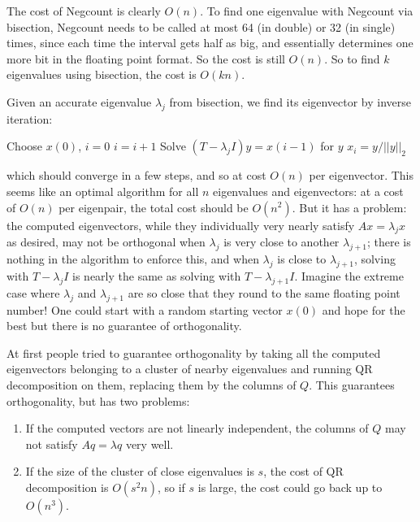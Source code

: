 \documentclass[11pt]{article}
\numberwithin{equation}{section}
\begin{document}
The cost of Negcount is clearly $O(n)$. To find one eigenvalue with Negcount via bisection, Negcount needs to be called at most 64 (in double) or 32 (in single)
times, since each time the interval gets half as big, and essentially determines one more bit in the floating point format. So the cost is still $O(n)$.
So to find $k$ eigenvalues using bisection, the cost is $O(kn)$.

Given an accurate eigenvalue $\lambda_j$ from bisection, we find its eigenvector by inverse iteration:
\begin{algorithmfrm}
    \begin{algorithmic}
        \State Choose $x(0)$, $i=0$
            \State $i = i+1$
            \State Solve $(T - \lambda_j I) y = x(i-1)$ for $y$
            \State $x_i = y / ||y||_2$
        \EndWhile
    \end{algorithmic}
\end{algorithmfrm}
which should converge in a few steps, and so at cost $O(n)$ per eigenvector. This seems like an optimal algorithm for all $n$ eigenvalues and eigenvectors:
at a cost of $O(n)$ per eigenpair, the total cost should be $O(n^2)$. But it has a problem: the computed eigenvectors, 
while they individually very nearly satisfy $Ax = \lambda_j x$ as desired, may not be orthogonal when $\lambda_j$ is very close to another $\lambda_{j+1}$; 
there is nothing in the algorithm to enforce this, and when $\lambda_{j}$ is close to $\lambda_{j+1}$, solving with $T - \lambda_{j}I$ 
is nearly the same as solving with $T - \lambda_{j+1}I$. Imagine the extreme case where $\lambda_j$ and $\lambda_{j+1}$ are so close that they round to the same floating point number!
One could start with a random starting vector $x(0)$ and hope for the best but there is no guarantee of orthogonality.

At first people tried to guarantee orthogonality by taking all the computed eigenvectors belonging to a cluster of nearby eigenvalues and running QR decomposition on them, 
replacing them by the columns of $Q$. This guarantees orthogonality, but has two problems: \begin{enumerate}
    \item If the computed vectors are not linearly independent, the columns of $Q$ may not satisfy $Aq = \lambda q$ very well.
    \item If the size of the cluster of close eigenvalues is $s$, the cost of QR decomposition is $O(s^2 n)$, so if $s$ is large, the cost could go back up to $O(n^3)$.
\end{enumerate}
\end{document}
